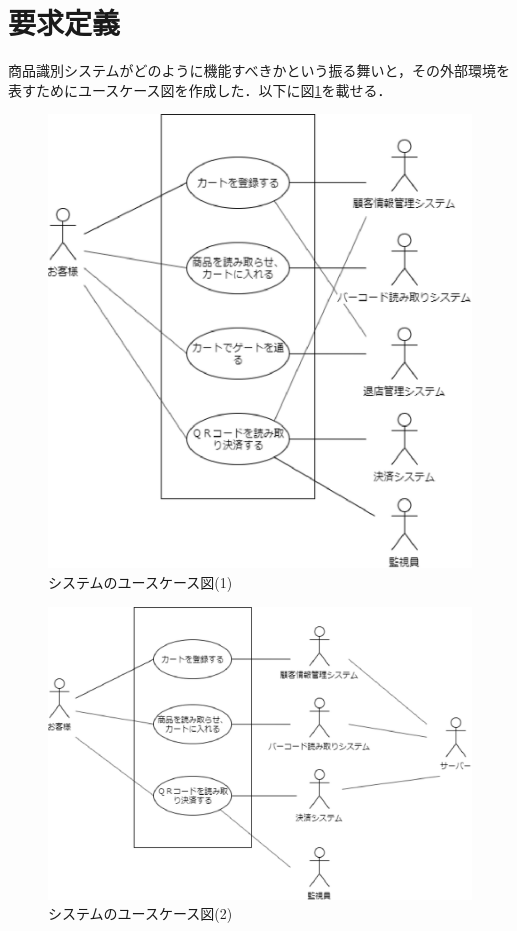

\section{要求定義}


商品識別システムがどのように機能すべきかという振る舞いと，その外部環境を表すためにユースケース図を作成した．以下に図\ref{usecase1}を載せる．

\begin{figure}[htbp]
\centering
\includegraphics{./picture/usecase1.eps}
\caption{システムのユースケース図(1)}
\label{usecase1}
\end{figure}

\begin{figure}[htbp]
\centering
\includegraphics[width = 15cm]{./picture/usecase2.eps}
\caption{システムのユースケース図(2)}
\label{usecase2}
\end{figure}


